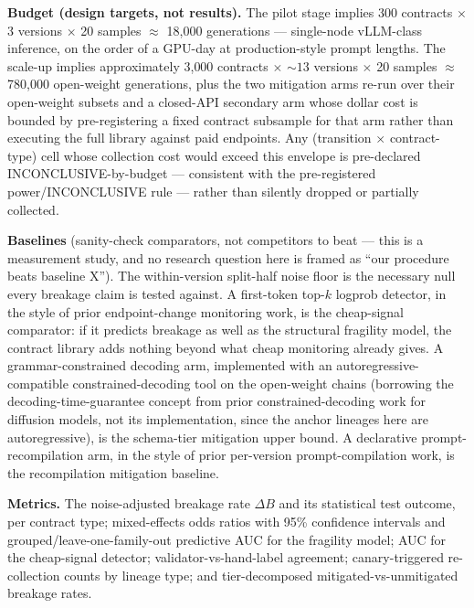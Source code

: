 \documentclass[11pt]{article}
\begin{document}
\textbf{Budget (design targets, not results).} The pilot stage implies 300 contracts $\times$ 3 versions $\times$ 20 samples $\approx$ 18{,}000 generations --- single-node vLLM-class inference, on the order of a GPU-day at production-style prompt lengths. The scale-up implies approximately 3{,}000 contracts $\times$ ${\sim}13$ versions $\times$ 20 samples $\approx$ 780{,}000 open-weight generations, plus the two mitigation arms re-run over their open-weight subsets and a closed-API secondary arm whose dollar cost is bounded by pre-registering a fixed contract subsample for that arm rather than executing the full library against paid endpoints. Any (transition $\times$ contract-type) cell whose collection cost would exceed this envelope is pre-declared INCONCLUSIVE-by-budget --- consistent with the pre-registered power/INCONCLUSIVE rule --- rather than silently dropped or partially collected.

\textbf{Baselines} (sanity-check comparators, not competitors to beat --- this is a measurement study, and no research question here is framed as ``our procedure beats baseline X''). The within-version split-half noise floor is the necessary null every breakage claim is tested against. A first-token top-$k$ logprob detector, in the style of prior endpoint-change monitoring work, is the cheap-signal comparator: if it predicts breakage as well as the structural fragility model, the contract library adds nothing beyond what cheap monitoring already gives. A grammar-constrained decoding arm, implemented with an autoregressive-compatible constrained-decoding tool on the open-weight chains (borrowing the decoding-time-guarantee concept from prior constrained-decoding work for diffusion models, not its implementation, since the anchor lineages here are autoregressive), is the schema-tier mitigation upper bound. A declarative prompt-recompilation arm, in the style of prior per-version prompt-compilation work, is the recompilation mitigation baseline.

\textbf{Metrics.} The noise-adjusted breakage rate $\Delta B$ and its statistical test outcome, per contract type; mixed-effects odds ratios with 95\% confidence intervals and grouped/leave-one-family-out predictive AUC for the fragility model; AUC for the cheap-signal detector; validator-vs-hand-label agreement; canary-triggered re-collection counts by lineage type; and tier-decomposed mitigated-vs-unmitigated breakage rates.
\end{document}
